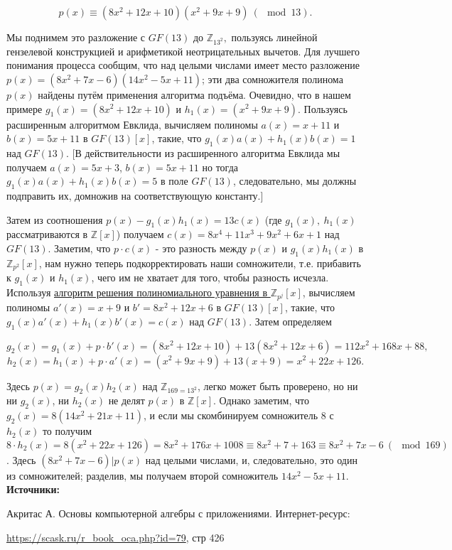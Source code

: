 \documentclass[12pt,a4paper]{scrartcl}
\begin{document}
$$p(x) \equiv (8x^2+12x+10)(x^2+9x+9)\ (\mod 13).$$

Мы поднимем это разложение с $GF(13)$ до $\mathbb{Z}_{13^2},$ пользуясь линейной гензелевой конструкцией и арифметикой неотрицательных вычетов. Для лучшего понимания процесса сообщим, что над целыми числами имеет место разложение $p(x)=(8x^2+7x-6)(14x^2-5x+11)$; эти два сомножителя полинома $p(x)$ найдены путём применения алгоритма подъёма. Очевидно, что в нашем примере $g_1(x)=(8x^2+12x+10)$ и $h_1(x)=(x^2+9x+9)$. Пользуясь расширенным алгоритмом Евклида, вычисляем полиномы $a(x)=x+11$ и $b(x)=5x+11$ в $GF(13)[x]$, такие, что $g_1(x)a(x)+h_1(x)b(x)=1$ над $GF(13)$. [В действительности из расширенного алгоритма Евклида мы получаем $a(x)=5x+3$, $b(x)=5x+11$ но тогда $g_1(x)a(x)+h_1(x)b(x)=5$ в поле $GF(13)$, следовательно, мы должны подправить их, домножив на соответствующую константу.]

Затем из соотношения $p(x)-g_1(x)h_1(x)=13c(x)$ (где $g_1(x),\ h_1(x)$ рассматриваются в $\mathbb{Z}[x]$) получаем $c(x)=8x^4+11x^3+9x^2+6x+1$ над $GF(13)$. Заметим, что $p\cdot c(x)$ - это разность между $p(x)$ и $g_1(x)h_1(x)$ в $\mathbb{Z}_{p^2}[x]$, нам нужно теперь подкорректировать наши сомножители, т.е. прибавить к $g_1(x)$ и $h_1(x)$, чего им не хватает для того, чтобы разность исчезла. Используя  \href{https://yatb.kksctf.ru/}{алгоритм решения полиномиального уравнения в $\mathbb{Z}_{p^j}[x]$}, вычисляем полиномы $a'(x)=x+9$ и $b'=8x^2+12x+6$ в $GF(13)[x]$, такие, что $g_1(x)a'(x)+h_1(x)b'(x)=c(x)$ над $GF(13)$. Затем определяем

$$g_2(x)=g_1(x)+p\cdot b'(x)=(8x^2+12x+10)+13(8x^2+12x+6)=112x^2+168x+88,$$
$$h_2(x)=h_1(x)+p\cdot a'(x)=(x^2+9x+9)+13(x+9)=x^2+22x+126.$$

Здесь $p(x)=g_2(x)h_2(x)$ над $\mathbb{Z}_{169=13^2}$, легко может быть проверено, но ни ни $g_2(x)$, ни $h_2(x)$ не делят $p(x)$ в $\mathbb{Z}[x]$. Однако заметим, что $g_2(x)=8(14x^2+21x+11)$, и если мы скомбинируем сомножитель $8$ с $h_2(x)$ то получим $8\cdot h_2(x)=8(x^2+22x+126)=8x^2+176x+1008 \equiv 8x^2+7+163 \equiv 8x^2+7x-6\ (\mod 169)$. Здесь $(8x^2+7x-6)|p(x)$ над целыми числами, и, следовательно, это один из сомножителей; разделив, мы получаем второй сомножитель $14x^2-5x+11$.\\

\textbf{Источники:}

Акритас А. Основы компьютерной алгебры с приложениями. Интернет-ресурс:

\href{https://scask.ru/r_book_oca.php?id=79}{https://scask.ru/r\_book\_oca.php?id=79}, стр 426
	
\end{document}

